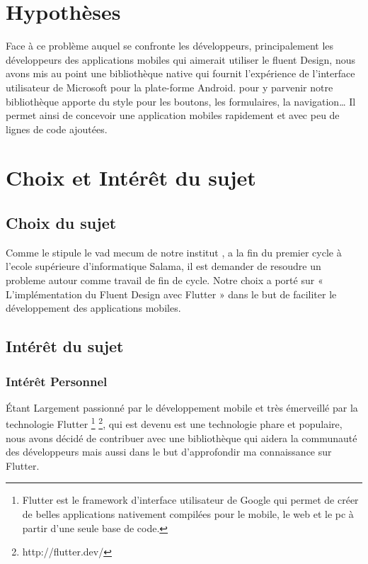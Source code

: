 \documentclass[a4paper,12pt]{report}
\begin{document}
        \section*{Hypothèses}

            Face à ce problème auquel se confronte les développeurs, principalement les développeurs des applications mobiles 
            qui aimerait utiliser le fluent Design, nous avons  mis au point une bibliothèque native qui fournit 
            l'expérience de l'interface utilisateur de Microsoft pour la plate-forme Android.
            pour y parvenir notre bibliothèque apporte du style pour les boutons, les formulaires, 
            la navigation… Il permet ainsi de concevoir une application mobiles rapidement et avec peu de 
            lignes de code ajoutées.
        
        \section*{Choix et Intérêt du sujet}
            
            \subsection*{Choix du sujet}
                Comme le stipule le vad mecum de notre institut , 
                a la fin  du premier cycle à l'ecole supérieure d'informatique Salama, 
                il est demander de resoudre un probleme autour comme travail de fin de cycle.
                Notre choix a porté sur « L'implémentation du Fluent Design avec Flutter » 
                dans le but de faciliter le développement des applications mobiles.
            
            \subsection*{Intérêt du sujet}

                \subsubsection*{Intérêt Personnel}
                    Étant Largement passionné par le développement mobile et très émerveillé par la technologie Flutter \footnote{Flutter est le framework d'interface utilisateur de Google qui permet de créer de belles applications nativement compilées pour le mobile, le web et le pc à partir d'une seule base de code.} \footnote{http://flutter.dev/}, 
                    qui est devenu est une technologie phare et populaire, 
                    nous avons décidé de contribuer avec une bibliothèque qui aidera la communauté des développeurs mais aussi 
                    dans le but d'approfondir ma connaissance sur Flutter.
                
\end{document}
